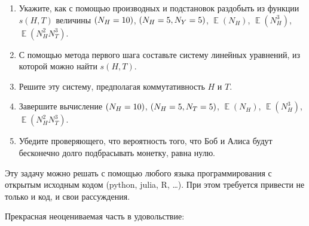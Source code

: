 \documentclass[12pt]{article}
\let\P\relax
\DeclareMathOperator{\P}{\mathbb{P}}
\DeclareMathOperator{\E}{\mathbb{E}}
\begin{document}
\begin{enumerate}
\begin{enumerate}
    \item Укажите, как с помощью производных и подстановок раздобыть из функции $s(H, T)$ величины $\P(N_H = 10)$,
    $\P(N_H = 5, N_Y=5)$, $\E(N_H)$, $\E(N_H^3)$, $\E(N_H^2 N_T^3)$.
    \item С помощью метода первого шага составьте систему линейных уравнений, из которой можно найти $s(H, T)$. 
    \item Решите эту систему, предполагая коммутативность $H$ и $T$. 
    \item Завершите вычисление $\P(N_H = 10)$, $\P(N_H = 5, N_T=5)$, $\E(N_H)$, $\E(N_H^3)$, $\E(N_H^2 N_T^3)$.
    \item Убедите проверяющего, что вероятность того, что Боб и Алиса будут бесконечно долго подбрасывать монетку, равна нулю.
\end{enumerate}

Эту задачу можно решать с помощью любого языка программирования с открытым исходным кодом (python, julia, R, \dots).
При этом требуется привести не только и код, и свои рассуждения.
    
\end{enumerate}


Прекрасная неоцениваемая часть в удовольствие:
\end{document}
